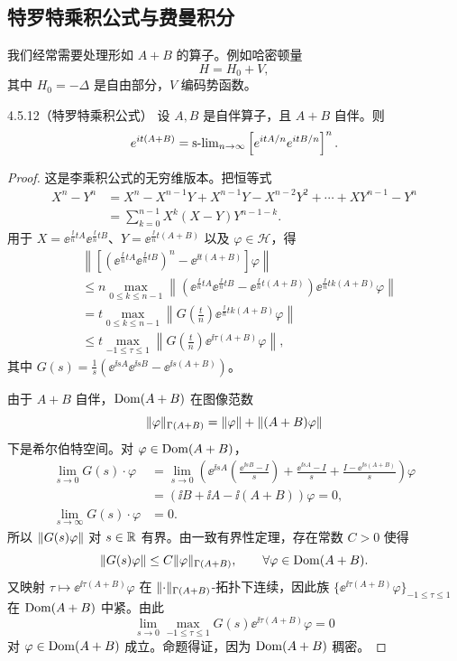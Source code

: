 \subsection{特罗特乘积公式与费曼积分}

我们经常需要处理形如 $A+B$ 的算子。例如哈密顿量
\[
H=H_0+V,
\]
其中 $H_0=-\Delta$ 是自由部分，$V$ 编码势函数。

\begin{proposition}{4.5.12}（特罗特乘积公式）
  设 $A,B$ 是自伴算子，且 $A+B$ 自伴。则
  \[
  e^{i t(A+B)}=\operatorname{s-lim}_{n\to\infty}
  \left[e^{i tA/n}e^{i tB/n}\right]^n.
  \]
\end{proposition}

\begin{proof}
  这是李乘积公式的无穷维版本。把恒等式
  \[
  \begin{aligned}
  X^n-Y^n&=X^n-X^{n-1}Y+X^{n-1}Y-X^{n-2}Y^2+\cdots+XY^{n-1}-Y^n\\
  &=\sum_{k=0}^{n-1}X^k(X-Y)Y^{n-1-k}.
  \end{aligned}
  \]
  用于 $X=\ee^{\frac{\ii}{n}tA}\ee^{\frac{\ii}{n}tB}$、$Y=\ee^{\frac{\ii}{n}t(A+B)}$ 以及 $\varphi\in\mathcal{H}$，得
  \begin{align*}
  &\left\|\left[\left(\ee^{\frac{\ii}{n}tA}\ee^{\frac{\ii}{n}tB}\right)^n-\ee^{\ii t(A+B)}\right]\varphi\right\|\\
  &\le n\max_{0\le k\le n-1}
  \left\|\left(\ee^{\frac{\ii}{n}tA}\ee^{\frac{\ii}{n}tB}-\ee^{\frac{\ii}{n}t(A+B)}\right)
  \ee^{\frac{\ii}{n}tk(A+B)}\varphi\right\|\\
  &=t\max_{0\le k\le n-1}
  \left\|G\left(\frac tn\right)\ee^{\frac{\ii}{n}tk(A+B)}\varphi\right\|\\
  &\le t\max_{-1\le\tau\le1}
  \left\|G\left(\frac tn\right)\ee^{\ii\tau(A+B)}\varphi\right\|,
  \end{align*}
  其中 $G(s)=\frac1s\left(\ee^{\ii sA}\ee^{\ii sB}-\ee^{\ii s(A+B)}\right)$。

  由于 $A+B$ 自伴，$\operatorname{Dom}(A+B)$ 在图像范数
  \[
  \lVert \varphi\rVert_{\Gamma(A+B)}=\lVert \varphi\rVert+\lVert (A+B)\varphi\rVert
  \]
  下是希尔伯特空间。对 $\varphi\in\operatorname{Dom}(A+B)$，
  \begin{align*}
  \lim_{s\to0}G(s)\cdot\varphi
  &=\lim_{s\to0}\left(\ee^{\ii sA}\left(\frac{\ee^{\ii sB}-I}{s}\right)
  +\frac{\ee^{\ii sA}-I}{s}+\frac{I-\ee^{\ii s(A+B)}}{s}\right)\varphi\\
  &=(\ii B+\ii A-\ii(A+B))\varphi=0,\\
  \lim_{s\to\infty}G(s)\cdot\varphi&=0.
  \end{align*}
  所以 $\lVert G(s)\varphi\rVert$ 对 $s\in\mathbb{R}$ 有界。由一致有界性定理，存在常数 $C>0$ 使得
  \[
  \lVert G(s)\varphi\rVert\le C\lVert \varphi\rVert_{\Gamma(A+B)},\qquad
  \forall\varphi\in\operatorname{Dom}(A+B).
  \]
  又映射 $\tau\mapsto\ee^{\ii\tau(A+B)}\varphi$ 在 $\lVert \cdot\rVert_{\Gamma(A+B)}$-拓扑下连续，因此族 $\{\ee^{\ii\tau(A+B)}\varphi\}_{-1\le\tau\le1}$ 在 $\operatorname{Dom}(A+B)$ 中紧。由此
  \[
  \lim_{s\to0}\max_{-1\le\tau\le1}G(s)\ee^{\ii\tau(A+B)}\varphi=0
  \]
  对 $\varphi\in\operatorname{Dom}(A+B)$ 成立。命题得证，因为 $\operatorname{Dom}(A+B)$ 稠密。
\end{proof}


